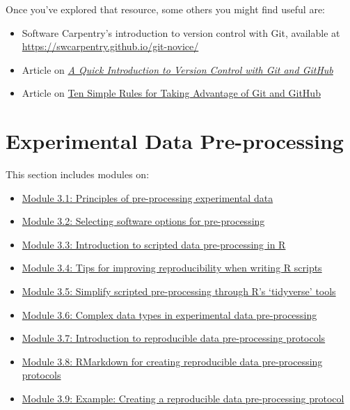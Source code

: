 \documentclass[]{tufte-book}
\providecommand{\tightlist}{%
  \setlength{\itemsep}{0pt}\setlength{\parskip}{0pt}}
\begin{document}
Once you've explored that resource, some others you might find useful are:

\begin{itemize}
\tightlist
\item
  Software Carpentry's introduction to version control with Git, available at
  \url{https://swcarpentry.github.io/git-novice/}
\item
  Article on \href{https://journals.plos.org/ploscompbiol/article?id=10.1371/journal.pcbi.1004668}{\emph{A Quick Introduction to Version Control with Git and GitHub}}
  \citep{blischak2016quick}
\item
  Article on \href{https://journals.plos.org/ploscompbiol/article?id=10.1371/journal.pcbi.1004947}{Ten Simple Rules for Taking Advantage of Git and GitHub}
  \citep{perez2016ten}
\end{itemize}

\chapter{Experimental Data Pre-processing}\label{experimental-data-pre-processing}

This section includes modules on:

\begin{itemize}
\tightlist
\item
  \hyperref[module12]{Module 3.1: Principles of pre-processing experimental data}
\item
  \hyperref[module12a]{Module 3.2: Selecting software options for pre-processing}
\item
  \hyperref[module13]{Module 3.3: Introduction to scripted data pre-processing in R}
\item
  \hyperref[module13a]{Module 3.4: Tips for improving reproducibility when writing R scripts}
\item
  \hyperref[module14]{Module 3.5: Simplify scripted pre-processing through R's `tidyverse' tools}
\item
  \hyperref[module15]{Module 3.6: Complex data types in experimental data pre-processing}
\item
  \hyperref[module18]{Module 3.7: Introduction to reproducible data pre-processing protocols}
\item
  \hyperref[module19]{Module 3.8: RMarkdown for creating reproducible data pre-processing protocols}
\item
  \hyperref[module20]{Module 3.9: Example: Creating a reproducible data pre-processing protocol}
\end{itemize}
\end{document}
